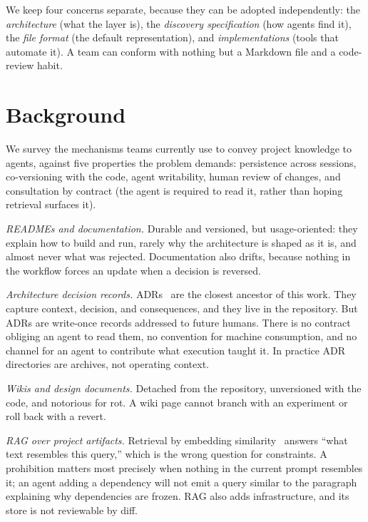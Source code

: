 \documentclass[sigconf,screen]{acmart}
\begin{document}
We keep four concerns separate, because they can be adopted independently: the
\emph{architecture} (what the layer is), the \emph{discovery specification} (how
agents find it), the \emph{file format} (the default representation), and
\emph{implementations} (tools that automate it). A team can conform with nothing
but a Markdown file and a code-review habit.

\section{Background}\label{sec:background}
We survey the mechanisms teams currently use to convey project knowledge to
agents, against five properties the problem demands: persistence across sessions,
co-versioning with the code, agent writability, human review of changes, and
consultation by contract (the agent is required to read it, rather than hoping
retrieval surfaces it).

\emph{READMEs and documentation.} Durable and versioned, but usage-oriented: they
explain how to build and run, rarely why the architecture is shaped as it is, and
almost never what was rejected. Documentation also drifts, because nothing in the
workflow forces an update when a decision is reversed.

\emph{Architecture decision records.} ADRs~\cite{nygard2011adr} are the closest
ancestor of this work. They capture context, decision, and consequences, and they
live in the repository. But ADRs are write-once records addressed to future
humans. There is no contract obliging an agent to read them, no convention for
machine consumption, and no channel for an agent to contribute what execution
taught it. In practice ADR directories are archives, not operating context.

\emph{Wikis and design documents.} Detached from the repository, unversioned with
the code, and notorious for rot. A wiki page cannot branch with an experiment or
roll back with a revert.

\emph{RAG over project artifacts.} Retrieval by embedding
similarity~\cite{lewis2020rag} answers ``what text resembles this query,'' which
is the wrong question for constraints. A prohibition matters most precisely when
nothing in the current prompt resembles it; an agent adding a dependency will not
emit a query similar to the paragraph explaining why dependencies are frozen. RAG
also adds infrastructure, and its store is not reviewable by diff.
\end{document}
